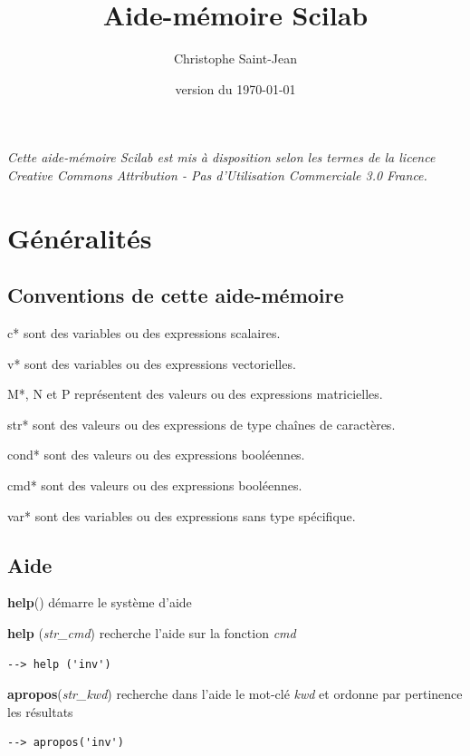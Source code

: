 \documentclass{article}
\title{\textbf{Aide-mémoire Scilab}}
\author{Christophe Saint-Jean}
\date{version du \today}
\begin{document}
\begin{multicols}{3}
\maketitle

\textit{Cette aide-mémoire Scilab est mis à disposition selon les termes de la licence Creative Commons Attribution - Pas d’Utilisation Commerciale 3.0 France. \ccby\ccnc\cc}
\section{Généralités}
\subsection{Conventions de cette aide-mémoire}
\begin{description}
\item{c*} sont des variables ou des expressions scalaires.
\item{v*} sont des variables ou des expressions vectorielles.
\item{M*, N et P} représentent des valeurs ou des expressions matricielles.
\item{str*} sont des valeurs ou des expressions de type chaînes de caractères.
\item{cond*} sont des valeurs ou des expressions booléennes.
\item{cmd*} sont des valeurs ou des expressions booléennes.
\item{var*} sont des variables ou des expressions sans type spécifique.
\end{description}
\subsection{Aide}
\begin{description}
\item{\textbf{help}()} démarre le système d'aide
\item{\textbf{help} (\textit{str\_cmd})} recherche l'aide sur la fonction \textit{cmd}
       \begin{verbatim}--> help ('inv')\end{verbatim}
\item{\textbf{apropos}(\textit{str\_kwd})} recherche dans l'aide le mot-clé \textit{kwd} et ordonne par pertinence les résultats
       \begin{verbatim}--> apropos('inv')\end{verbatim}
\end{description}

\end{multicols}
\end{document}
